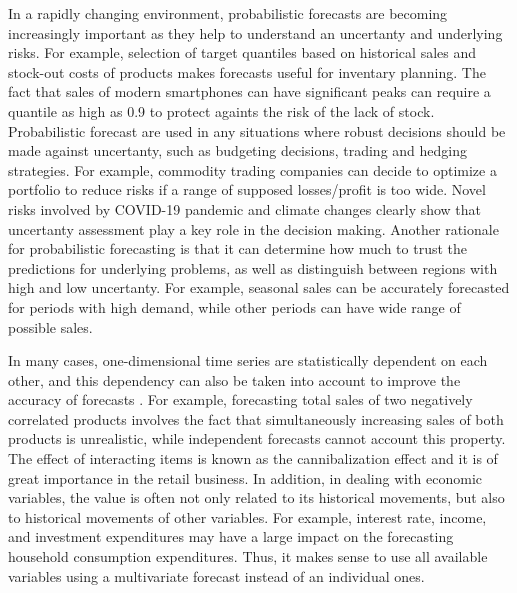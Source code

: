 \documentclass[12pt,a4paper]{article}
\begin{document}
In a rapidly changing environment, probabilistic forecasts are becoming increasingly important as they help to understand an uncertanty and underlying risks. For example, selection of target quantiles based on historical sales and stock-out costs of products makes forecasts useful for inventary planning. The fact that sales of modern smartphones can have significant peaks can require a quantile as high as 0.9 to protect againts the risk of the lack of stock. Probabilistic forecast are used in any situations where robust decisions should be made against uncertanty, such as budgeting decisions, trading and hedging strategies. For example, commodity trading companies can decide to optimize a portfolio to reduce risks if a range of supposed losses/profit is too wide. Novel risks involved by COVID-19 pandemic and climate changes clearly show that uncertanty assessment play a key role in the decision making. Another rationale for probabilistic forecasting is that it can determine how much to trust the predictions for underlying problems, as well as distinguish between regions with high and low uncertanty. For example, seasonal sales can be accurately forecasted for periods with high demand, while other periods can have wide range of possible sales.

In many cases, one-dimensional time series are statistically dependent on each other, and this dependency can also be taken into account to improve the accuracy of forecasts \cite{normflow2021}. For example, forecasting total sales of two negatively correlated products involves the fact that simultaneously increasing sales of both products is unrealistic, while independent forecasts cannot account this property. The effect of interacting items is known as the cannibalization effect and it is of great importance in the retail business. In addition, in dealing with economic variables, the value is often not only related to its historical movements, but also to historical movements of other variables. For example, interest rate, income, and investment expenditures may have a large impact on the forecasting household consumption expenditures. Thus, it makes sense to use all available variables using a multivariate forecast instead of an individual ones.
\end{document}
